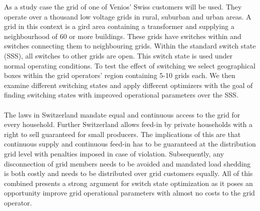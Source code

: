 

As a study case the grid of one of Venios' Swiss customers will be used. 
They operate over a thousand
low voltage grids in rural, suburban and urban areas\autocite{venios}. 
A grid in this context is a gird area containing a transformer and supplying
a neighbourhood of 60 or more buildings\autocite{venios}. These grids have switches
within and switches connecting them to neighbouring grids. Within the standard
switch state (SSS), all switches to other grids are open. This switch state is
used under normal operating conditions\autocite{venios}. To test the effect of switching
we select geographical boxes within the grid operators' region containing 5-10 grids each.
We then examine different switching states and apply different optimizers with the goal
of finding switching states with improved operational parameters over the SSS.\\
\\
The laws in Switzerland mandate equal and continuous access to the grid for every household.
Further Switzerland allows feed-in by private households with a right to sell guaranteed
for small producers\autocite{venios}. The implications of this are that continuous supply
and continuous feed-in has to be guaranteed at the distribution grid level with penalties
imposed in case of violation. Subsequently, any disconnection of grid members needs
to be avoided and mandated load shedding is both costly and needs to be distributed
over grid customers equally\autocite{venios}. All of this combined presents a strong
argument for switch state optimization as it poses an opportunity improve grid operational
parameters with almost no costs to the grid operator.
